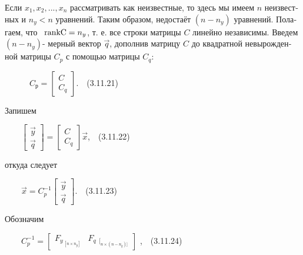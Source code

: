 \documentclass[a4paper]{article}
\newcommand\normalsubformula[1]{\text{\mathversion{normal}$#1$}}
\begin{document}
\bigskip

{\begin{russian}\sffamily
Если  $x_1,x_2,...,x_n$ рассматривать как неизвестные, то здесь мы имеем  $n$ неизвестных и  $n_y<n$ уравнений. Таким
образом, недостаёт  $\left(n-n_y\right)$ уравнений. Полагаем, что \  $\normalsubformula{\text{rankC}}=n_y$, т. е. все
строки матрицы  $C$ линейно независимы. Введем  $\left(n-n_y\right)$- мерный вектор  $\vec q$, дополнив матрицу  $C$ до
квадратной невырожденной матрицы  $C_p$ с помощью матрицы  $C_q$:
\end{russian}}

{\begin{russian}\sffamily
\ \ \ \ \ \  $C_р=\left[\begin{matrix}C\\C_q\end{matrix}\right]$.\ \ (3.11.21)
\end{russian}}

{\begin{russian}\sffamily
Запишем
\end{russian}}

{\begin{russian}\sffamily
\ \ \ \  $\left[\begin{matrix}\vec y\\\vec q\end{matrix}\right]=\left[\begin{matrix}C\\C_q\end{matrix}\right]\vec
x$,\ \ (3.11.22)
\end{russian}}

{\begin{russian}\sffamily
откуда следует
\end{russian}}

{\begin{russian}\sffamily
\ \ \ \  $\vec x=C_p^{-1}\left[\begin{matrix}\vec y\\\vec q\end{matrix}\right]$.\ \ (3.11.23)
\end{russian}}

{\begin{russian}\sffamily
Обозначим 
\end{russian}}

{\begin{russian}\sffamily
\ \ \ \  $C_p^{-1}=\left[\begin{matrix}F_{y_{\;[n\times n_y]}}&F_{q\;\;[_{n\times (n-n_y)]}}\end{matrix}\right]$
,\ \ (3.11.24)
\end{russian}}
\end{document}
